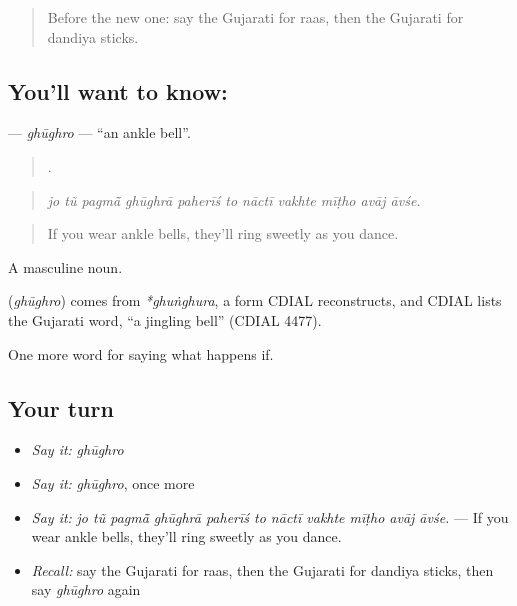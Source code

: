 \label{lesson:GU-C554-ghughro}



\begin{quote}
Before the new one: say the Gujarati for raas, then the Gujarati for dandiya sticks.
\end{quote}

\subsection*{You'll want to know: }
\textbf{} — \emph{ghūghro} — \textquotedblleft{}an ankle bell\textquotedblright{}.

\begin{quote}
          .
\end{quote}

\begin{quote}
\emph{jo tũ pagmā̃ ghūghrā paherīś to nāctī vakhte mīṭho avāj āvśe.}
\end{quote}

\begin{quote}
If you wear ankle bells, they'll ring sweetly as you dance.
\end{quote}

A masculine noun.

\begin{cousinweb}
\textbf{} (\emph{ghūghro}) comes from \emph{*ghuṅghura}, a form CDIAL reconstructs, and CDIAL lists the Gujarati word, \textquotedblleft{}a jingling bell\textquotedblright{} (CDIAL 4477).
\end{cousinweb}

\begin{grammarlens}[title={What you've built}]
One more word for saying what happens if.
\end{grammarlens}

\subsection*{Your turn}
\begin{itemize}
\raggedright
  \item \emph{Say it:} \emph{ghūghro}
  \item \emph{Say it:} \emph{ghūghro}, once more
  \item \emph{Say it:} \emph{jo tũ pagmā̃ ghūghrā paherīś to nāctī vakhte mīṭho avāj āvśe.} — If you wear ankle bells, they'll ring sweetly as you dance.
  \item \emph{Recall:} say the Gujarati for raas, then the Gujarati for dandiya sticks, then say \emph{ghūghro} again
\end{itemize}

